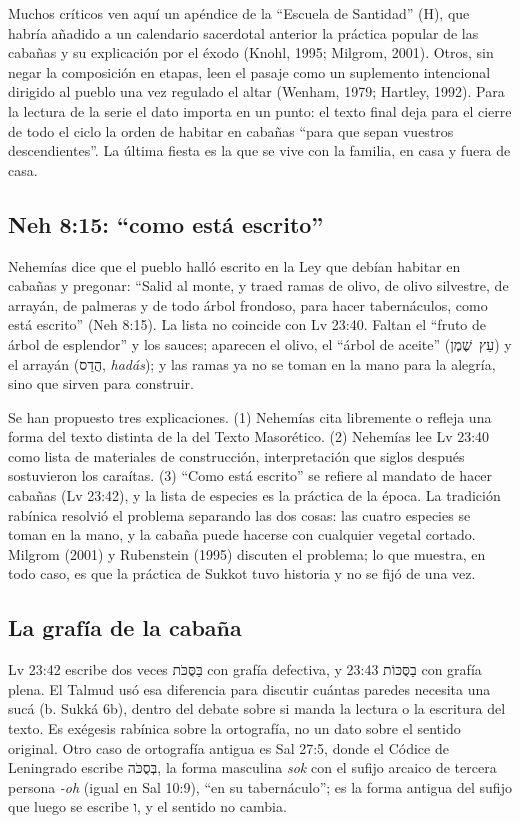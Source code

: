 \documentclass[11pt,letterpaper]{article}
\newcommand{\heb}[1]{\mbox{\foreignlanguage{hebrew}{#1}}}
\begin{document}
Muchos críticos ven aquí un apéndice de la ``Escuela de Santidad'' (H), que habría añadido a un calendario sacerdotal anterior la práctica popular de las cabañas y su explicación por el éxodo (Knohl, 1995; Milgrom, 2001). Otros, sin negar la composición en etapas, leen el pasaje como un suplemento intencional dirigido al pueblo una vez regulado el altar (Wenham, 1979; Hartley, 1992). Para la lectura de la serie el dato importa en un punto: el texto final deja para el cierre de todo el ciclo la orden de habitar en cabañas ``para que sepan vuestros descendientes''. La última fiesta es la que se vive con la familia, en casa y fuera de casa.

\subsection{Neh 8:15: ``como está escrito''}
Nehemías dice que el pueblo halló escrito en la Ley que debían habitar en cabañas y pregonar: ``Salid al monte, y traed ramas de olivo, de olivo silvestre, de arrayán, de palmeras y de todo árbol frondoso, para hacer tabernáculos, como está escrito'' (Neh 8:15). La lista no coincide con Lv 23:40. Faltan el ``fruto de árbol de esplendor'' y los sauces; aparecen el olivo, el ``árbol de aceite'' (\heb{עֵץ שֶׁמֶן}) y el arrayán (\heb{הֲדַס}, \emph{hadás}); y las ramas ya no se toman en la mano para la alegría, sino que sirven para construir.

Se han propuesto tres explicaciones. (1) Nehemías cita libremente o refleja una forma del texto distinta de la del Texto Masorético. (2) Nehemías lee Lv 23:40 como lista de materiales de construcción, interpretación que siglos después sostuvieron los caraítas. (3) ``Como está escrito'' se refiere al mandato de hacer cabañas (Lv 23:42), y la lista de especies es la práctica de la época. La tradición rabínica resolvió el problema separando las dos cosas: las cuatro especies se toman en la mano, y la cabaña puede hacerse con cualquier vegetal cortado. Milgrom (2001) y Rubenstein (1995) discuten el problema; lo que muestra, en todo caso, es que la práctica de Sukkot tuvo historia y no se fijó de una vez.

\subsection{La grafía de la cabaña}
Lv 23:42 escribe dos veces \heb{בַּסֻּכֹּת} con grafía defectiva, y 23:43 \heb{בַסֻּכּוֹת} con grafía plena. El Talmud usó esa diferencia para discutir cuántas paredes necesita una sucá (b. Sukká 6b), dentro del debate sobre si manda la lectura o la escritura del texto. Es exégesis rabínica sobre la ortografía, no un dato sobre el sentido original. Otro caso de ortografía antigua es Sal 27:5, donde el Códice de Leningrado escribe \heb{בְּסֻכֹּה}, la forma masculina \emph{sok} con el sufijo arcaico de tercera persona \emph{-oh} (igual en Sal 10:9), ``en su tabernáculo''; es la forma antigua del sufijo que luego se escribe \heb{ו}, y el sentido no cambia.
\end{document}

